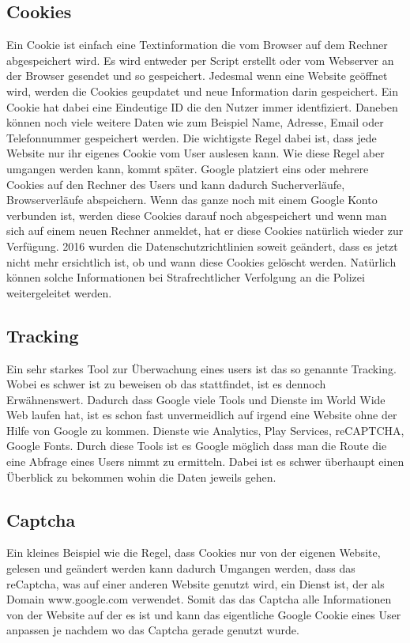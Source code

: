 \documentclass{article}
\begin{document}
\subsection{Cookies}
Ein Cookie ist einfach eine Textinformation die vom Browser auf dem Rechner abgespeichert wird. Es wird entweder per Script erstellt oder vom Webserver an der Browser gesendet und so gespeichert. Jedesmal wenn eine Website geöffnet wird, werden die Cookies geupdatet und neue Information darin gespeichert. Ein Cookie hat dabei eine Eindeutige ID die den Nutzer immer identfiziert. Daneben können noch viele weitere Daten wie zum Beispiel Name, Adresse, Email oder Telefonnummer gespeichert werden. Die wichtigste Regel dabei ist, dass jede Website nur ihr eigenes Cookie vom User auslesen kann. Wie diese Regel aber umgangen werden kann, kommt später. Google platziert eins oder mehrere Cookies auf den Rechner des Users und kann dadurch Sucherverläufe, Browserverläufe abspeichern.  Wenn das ganze noch mit einem Google Konto verbunden ist, werden diese Cookies darauf noch abgespeichert und wenn man sich auf einem neuen Rechner anmeldet, hat er diese Cookies natürlich wieder zur Verfügung. 2016 wurden die Datenschutzrichtlinien soweit geändert, dass es jetzt nicht mehr ersichtlich ist, ob und wann diese Cookies gelöscht werden. Natürlich können solche Informationen bei Strafrechtlicher Verfolgung an die Polizei weitergeleitet werden.

\subsection{Tracking}
Ein sehr starkes Tool zur Überwachung eines users ist das so genannte Tracking. Wobei es schwer ist zu beweisen ob das stattfindet, ist es dennoch Erwähnenswert. Dadurch dass Google viele Tools und Dienste im World Wide Web laufen hat, ist es schon fast unvermeidlich auf irgend eine Website ohne der Hilfe von Google zu kommen. Dienste wie Analytics, Play Services, reCAPTCHA, Google Fonts. Durch diese Tools ist es Google möglich dass man die Route die eine Abfrage eines Users nimmt zu ermitteln. Dabei ist es schwer überhaupt einen Überblick zu bekommen wohin die Daten jeweils gehen.

\subsection{Captcha}
Ein kleines Beispiel wie die Regel, dass Cookies nur von der eigenen Website, gelesen und geändert werden kann dadurch Umgangen werden, dass das reCaptcha, was auf einer anderen Website genutzt wird, ein Dienst ist, der als Domain www.google.com verwendet. Somit das das Captcha alle Informationen von der Website auf der es ist und kann das eigentliche Google Cookie eines User anpassen je nachdem wo das Captcha gerade genutzt wurde.
\end{document}
